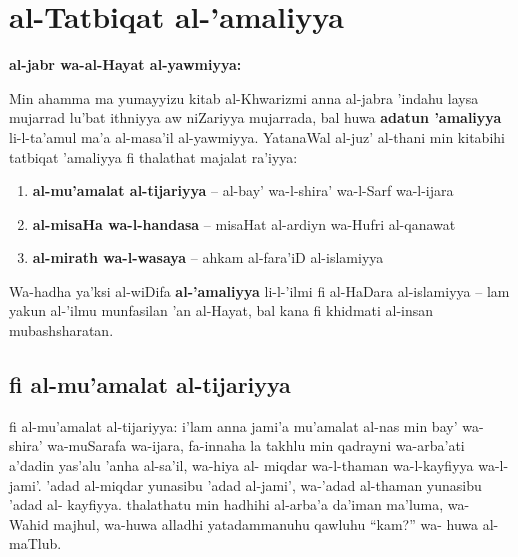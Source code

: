 \documentclass[11pt,a4paper]{book}
\begin{document}
\newpage

\part{al-Tatbiqat al-'amaliyya}
\label{part:practical}

\begin{historicalbox}
\textbf{al-jabr wa-al-Hayat al-yawmiyya:}

Min ahamma ma yumayyizu kitab al-Khwarizmi anna al-jabra 'indahu
laysa mujarrad lu'bat ithniyya aw niZariyya mujarrada, bal huwa
\textbf{adatun 'amaliyya} li-l-ta'amul ma'a al-masa'il al-yawmiyya.
YatanaWal al-juz' al-thani min kitabihi tatbiqat 'amaliyya fi
thalathat majalat ra'iyya:

\begin{enumerate}
  \item \textbf{al-mu'amalat al-tijariyya} -- al-bay' wa-l-shira'
    wa-l-Sarf wa-l-ijara
  \item \textbf{al-misaHa wa-l-handasa} -- misaHat al-ardiyn wa-Hufri
    al-qanawat
  \item \textbf{al-mirath wa-l-wasaya} -- ahkam al-fara'iD al-islamiyya
\end{enumerate}

Wa-hadha ya'ksi al-wiDifa \textbf{al-'amaliyya} li-l-'ilmi fi
al-HaDara al-islamiyya -- lam yakun al-'ilmu munfasilan 'an al-Hayat,
bal kana fi khidmati al-insan mubashsharatan.
\end{historicalbox}

\newpage

\chapter{fi al-mu'amalat al-tijariyya}
\label{ch:mercantile}

\begin{originaltext}
fi al-mu'amalat al-tijariyya: i'lam anna jami'a mu'amalat al-nas
min bay' wa-shira' wa-muSarafa wa-ijara, fa-innaha la takhlu min
qadrayni wa-arba'ati a'dadin yas'alu 'anha al-sa'il, wa-hiya al-
miqdar wa-l-thaman wa-l-kayfiyya wa-l-jami'. 'adad al-miqdar
yunasibu 'adad al-jami', wa-'adad al-thaman yunasibu 'adad al-
kayfiyya. thalathatu min hadhihi al-arba'a da'iman ma'luma, wa-
Wahid majhul, wa-huwa alladhi yatadammanuhu qawluhu ``kam?'' wa-
huwa al-maTlub.
\end{originaltext}
\end{document}
